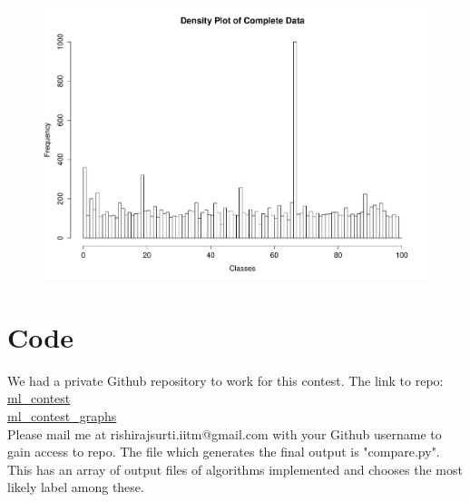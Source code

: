 \documentclass[a4paper]{article}
\begin{document}
\begin{figure}
\centering
\includegraphics[width=1\textwidth]{../plots/CompleteData_targets.pdf}
\caption{\label{fig:data}}
\end{figure}

\section{Code}
We had a private Github repository to work for this contest.
The link to repo:\\ \href{https://github.com/rishirajsurti/ml_contest}{ml\_contest} \\
\href{https://github.com/rishirajsurti/ml_contest/graphs/contributors}{ml\_contest\_graphs}\\
Please mail me at rishirajsurti.iitm@gmail.com with your Github username to gain access to repo.
The file which generates the final output is "compare.py".
This has an array of output files of algorithms implemented and chooses the most likely label among these.
\end{document}
